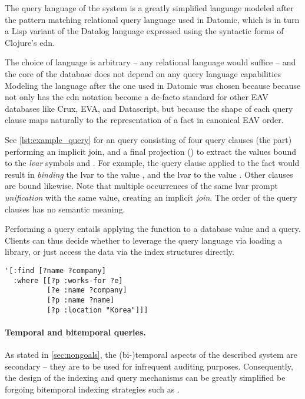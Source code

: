 The query language of the system is a greatly simplified language modeled after the pattern matching relational query language used in Datomic, which is in turn a Lisp variant of the Datalog \cite{abiteboul1988datalog} language expressed using the syntactic forms of Clojure's \gls{edn}.

The choice of language is arbitrary -- any relational language would suffice -- and the core of the database does not depend on any query language capabilities Modeling the language after the one used in Datomic was chosen because because not only has the edn notation become a de-facto standard for other EAV databases like Crux, EVA, and Datascript, but because the shape of each query clause maps naturally to the representation of a fact in canonical EAV order.

See \autoref{lst:example_query} for an query consisting of four query clauses (the  part) performing an implicit join, and a final projection () to extract the values bound to the \emph{\gls{lvar}} symbols  and . For example, the query clause  applied to the fact  would result in \emph{binding} the lvar  to the value , and the lvar  to the value . Other clauses are bound likewise. Note that multiple occurrences of the same lvar prompt \emph{unification} with the same value, creating an implicit \emph{join}. The order of the query clauses has no semantic meaning.

Performing a query entails applying the  function to a database value and a query. Clients can thus decide whether to leverage the query language via loading a library, or just access the data via the index structures directly.

\begin{lstlisting}[label={lst:example_query},caption="Who from Korea is working for whom?"]
'[:find [?name ?company]
  :where [[?p :works-for ?e]
          [?e :name ?company]
          [?p :name ?name]
          [?p :location "Korea"]]]
\end{lstlisting}

\paragraph{Temporal and bitemporal queries.}
As stated in \autoref{sec:nongoals}, the (bi-)temporal aspects of the described system are secondary -- they are to be used for infrequent auditing purposes. Consequently, the design of the indexing and query mechanisms can be greatly simplified be forgoing bitemporal indexing strategies such as \cite{nascimento1995ivtt}.

